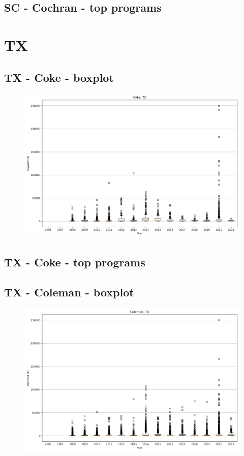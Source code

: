 \subsection*{SC - Cochran - top programs}

\newpage
\section*{TX}
\subsection*{TX - Coke - boxplot}
\begin{figure}[h]
\centering
\includegraphics[width=7in]{../output/boxplots/counties/Coke-TX_boxplot.png}
\end{figure}


\subsection*{TX - Coke - top programs}

\newpage
\subsection*{TX - Coleman - boxplot}
\begin{figure}[h]
\centering
\includegraphics[width=7in]{../output/boxplots/counties/Coleman-TX_boxplot.png}
\end{figure}


